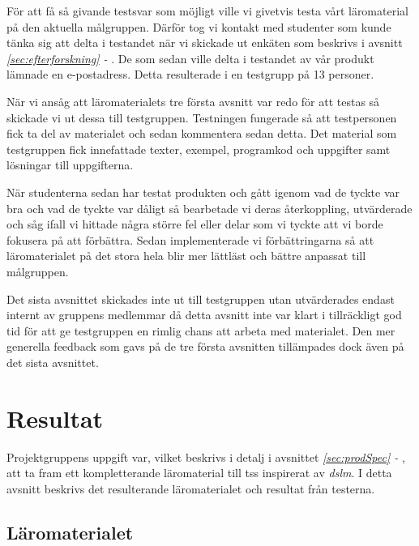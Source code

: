 \documentclass[12pt,a4paper,twoside,openright]{article}
\begin{document}
För att få så givande testsvar som möjligt ville vi givetvis testa
vårt läromaterial på den aktuella målgruppen. Därför tog vi kontakt
med studenter som kunde tänka sig att delta i testandet när vi
skickade ut enkäten som beskrivs i avsnitt
\textit{\ref{sec:efterforskning} - }. De
som sedan ville delta i testandet av vår produkt lämnade en
e-postadress. Detta resulterade i en testgrupp på 13 personer.

När vi ansåg att läromaterialets tre första avsnitt var redo för att
testas så skickade vi ut dessa till testgruppen. Testningen fungerade
så att testpersonen fick ta del av materialet och sedan kommentera
sedan detta.  Det material som testgruppen fick innefattade texter,
exempel, programkod och uppgifter samt lösningar till uppgifterna.

När studenterna sedan har testat produkten och gått igenom vad de
tyckte var bra och vad de tyckte var dåligt så bearbetade vi deras
återkoppling, utvärderade och såg ifall vi hittade några större fel
eller delar som vi tyckte att vi borde fokusera på att
förbättra. Sedan implementerade vi förbättringarna så att
läromaterialet på det stora hela blir mer lättläst och bättre anpassat
till målgruppen.

Det sista avsnittet skickades inte ut till testgruppen utan
utvärderades endast internt av gruppens medlemmar då detta avsnitt
inte var klart i tillräckligt god tid för att ge testgruppen en rimlig
chans att arbeta med materialet. Den mer generella feedback som gavs
på de tre första avsnitten tillämpades dock även på det sista
avsnittet.

\newpage

\section{Resultat}


%
Projektgruppens uppgift var, vilket beskrivs i detalj i avsnittet
\textit{\ref{sec:prodSpec} - }, att ta fram ett
kompletterande läromaterial till \gls{tss} inspirerat av
\textit{\gls{dslm}}.  I detta avsnitt beskrivs det resulterande
läromaterialet och resultat från testerna.

\subsection{Läromaterialet}
\end{document}
